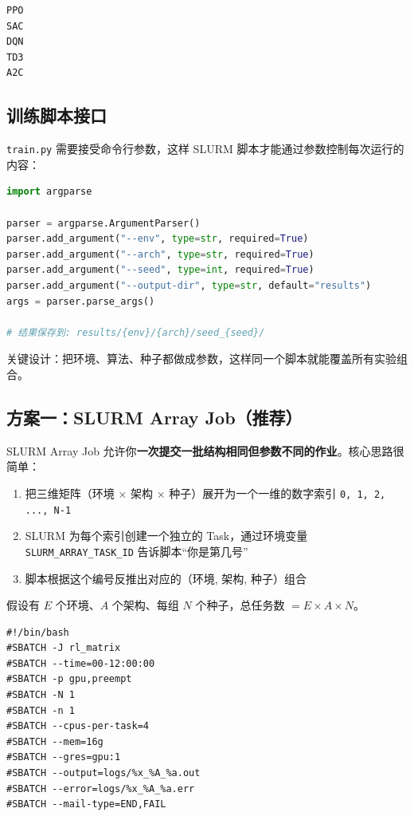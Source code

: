 \begin{lstlisting}[title={\texttt{configs/archs.txt}}]
PPO
SAC
DQN
TD3
A2C
\end{lstlisting}

\subsection{训练脚本接口}

\texttt{train.py} 需要接受命令行参数，这样 SLURM 脚本才能通过参数控制每次运行的内容：

\begin{lstlisting}[language=python,title={\texttt{train.py}（参数部分）}]
import argparse

parser = argparse.ArgumentParser()
parser.add_argument("--env", type=str, required=True)
parser.add_argument("--arch", type=str, required=True)
parser.add_argument("--seed", type=int, required=True)
parser.add_argument("--output-dir", type=str, default="results")
args = parser.parse_args()

# 结果保存到: results/{env}/{arch}/seed_{seed}/
\end{lstlisting}

关键设计：把环境、算法、种子都做成参数，这样同一个脚本就能覆盖所有实验组合。

\subsection{方案一：SLURM Array Job（推荐）}

SLURM Array Job 允许你\textbf{一次提交一批结构相同但参数不同的作业}。核心思路很简单：

\begin{enumerate}[nosep]
  \item 把三维矩阵（环境 $\times$ 架构 $\times$ 种子）展开为一个一维的数字索引 \texttt{0, 1, 2, ..., N-1}
  \item SLURM 为每个索引创建一个独立的 Task，通过环境变量 \texttt{SLURM\_ARRAY\_TASK\_ID} 告诉脚本``你是第几号''
  \item 脚本根据这个编号反推出对应的（环境, 架构, 种子）组合
\end{enumerate}

假设有 $E$ 个环境、$A$ 个架构、每组 $N$ 个种子，总任务数 $= E \times A \times N$。

\begin{lstlisting}[language=slurm,title={\texttt{scripts/run\_matrix.sh}}]
#!/bin/bash
#SBATCH -J rl_matrix
#SBATCH --time=00-12:00:00
#SBATCH -p gpu,preempt
#SBATCH -N 1
#SBATCH -n 1
#SBATCH --cpus-per-task=4
#SBATCH --mem=16g
#SBATCH --gres=gpu:1
#SBATCH --output=logs/%x_%A_%a.out
#SBATCH --error=logs/%x_%A_%a.err
#SBATCH --mail-type=END,FAIL
\end{lstlisting}

